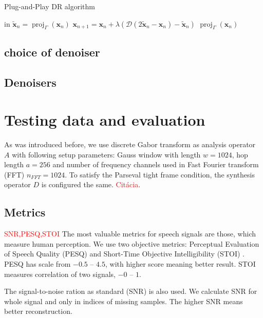 \documentclass[conference]{IEEEtran}
\newcommand{\todo}[1]{\textcolor{red}{#1}}
\begin{document}
\begin{algorithm}
	\caption{Plug-and-Play DR algorithm}
	\begin{algorithmic}[1]
		\renewcommand{\algorithmicrequire}{\textbf{Input:}}
		\renewcommand{\algorithmicensure}{\textbf{Output:}}
		\REQUIRE in
		\STATE $\mathbf{\widetilde{x}}_n=\operatorname{proj}_{\Gamma}(\mathbf{x}_n) $ 
		\STATE $ \mathbf{x}_{n+1} = \mathbf{x}_n + \lambda \left( \mathcal{D} \left(2\mathbf{\widetilde{x}}_n-\mathbf{x}_n \right)-\mathbf{\widetilde{x}}_n\right)$
		\ENDFOR
		\RETURN $\operatorname{proj}_{\Gamma}(\mathbf{x}_n)$ 
	\end{algorithmic} 
\end{algorithm}
\subsection{choice of denoiser}

\subsection{Denoisers}

\section{Testing data and evaluation}\label{sec:eval}

As was introduced before, we use discrete Gabor transform as analysis operator $A$ with following setup parameters: Gauss  window with length $w =1024 $, hop length $a = 256$ and number of frequency channels used in Fast Fourier transform (FFT) $n_{FFT} = 1024$.
To satisfy the Parseval tight frame condition, the synthesis operator $D$ is configured the same. \todo{Citácia}.

\subsection{Metrics}

\todo{SNR,PESQ,STOI}
The most valuable metrics for speech signals are those, which measure human perception.
We use two objective metrics: Perceptual Evaluation of Speech Quality (PESQ) \cite{Rix2001} and 
Short-Time Objective Intelligibility (STOI) \cite{Taal2010}.
PESQ has scale from $-0.5$ -- $4.5$, with higher score meaning better result.
STOI measures correlation of two signals, $-0$ -- $1$.

The signal-to-noise ration as standard (SNR) is also used.
We calculate SNR for whole signal and only in indices of missing samples.
The higher SNR means better reconstruction.
\end{document}
